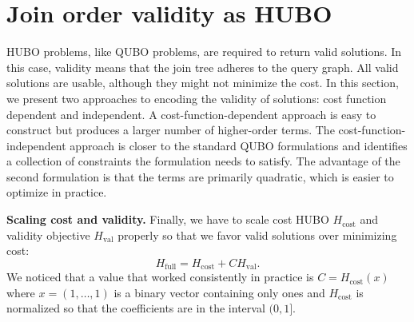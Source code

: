 \section{Join order validity as HUBO}

HUBO problems, like QUBO problems, are required to return valid solutions. In this case, validity means that the join tree adheres to the query graph. All valid solutions are usable, although they might not minimize the cost. In this section, we present two approaches to encoding the validity of solutions: cost function dependent and independent. A cost-function-dependent approach is easy to construct but produces a larger number of higher-order terms. The cost-function-independent approach is closer to the standard QUBO formulations and identifies a collection of constraints the formulation needs to satisfy. The advantage of the second formulation is that the terms are primarily quadratic, which is easier to optimize in practice.




\textbf{Scaling cost and validity.} Finally, we have to scale cost HUBO $H_{\text{cost}}$ and validity objective $H_{\text{val}}$ properly so that we favor valid solutions over minimizing cost:
\begin{displaymath}
H_{\text{full}} = H_{\text{cost}} + CH_{\text{val}}.
\end{displaymath}
We noticed that a value that worked consistently in practice is $C = H_{\text{cost}}(x)$ where $x = (1, \ldots, 1)$ is a binary vector containing only ones and $H_{\text{cost}}$ is normalized so that the coefficients are in the interval $(0,1]$.
